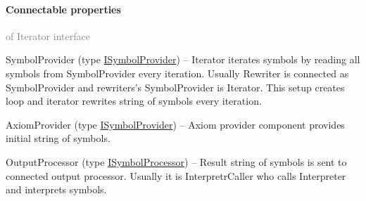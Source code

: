 	\paragraph{Connectable properties}\textcolor{gray}{of Iterator interface}
	\begin{description*}
		\item[SymbolProvider]
		(type \hyperref[Malsys.Processing.Components.ISymbolProvider]{ISymbolProvider})
			-- Iterator iterates symbols by reading all symbols from SymbolProvider every iteration.
            Usually Rewriter is connected as SymbolProvider and rewriters's SymbolProvider is Iterator.
            This setup creates loop and iterator rewrites string of symbols every iteration.
		\item[AxiomProvider]
		(type \hyperref[Malsys.Processing.Components.ISymbolProvider]{ISymbolProvider})
			-- Axiom provider component provides initial string of symbols.
		\item[OutputProcessor]
		(type \hyperref[Malsys.Processing.Components.ISymbolProcessor]{ISymbolProcessor})
			-- Result string of symbols is sent to connected output processor.
            Usually it is InterpretrCaller who calls Interpreter and interprets symbols.
	\end{description*}
	

